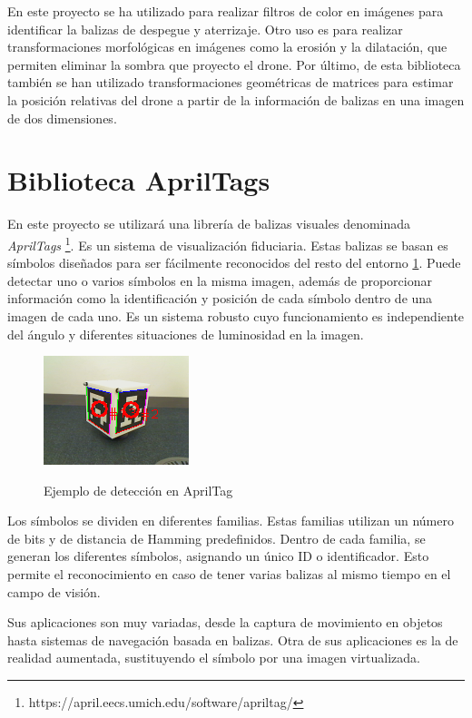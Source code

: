 {	En este proyecto se ha utilizado para realizar filtros de color en imágenes para identificar la balizas de despegue y aterrizaje. Otro uso es para realizar transformaciones morfológicas en imágenes como la erosión y la dilatación, que permiten eliminar la sombra que proyecto el drone. Por último, de esta biblioteca también se han utilizado transformaciones geométricas de matrices para estimar la posición relativas del drone a partir de la información de balizas en una imagen de dos dimensiones.
	
	\section{Biblioteca AprilTags}
	\label{sec:AprilTags}
	
	En este proyecto se utilizará una librería de balizas visuales denominada \textit{AprilTags} \footnote{https://april.eecs.umich.edu/software/apriltag/}. Es un sistema de visualización fiduciaria. Estas balizas se basan es símbolos diseñados para ser fácilmente reconocidos del resto del entorno \ref{FIG:33_apriltag}. Puede detectar uno o varios símbolos en la misma imagen, además de proporcionar información como la identificación y posición de cada símbolo dentro de una imagen de cada uno. Es un sistema robusto cuyo funcionamiento es independiente del ángulo y diferentes situaciones de luminosidad en la imagen.
	
	\begin{figure}[H]
		\centering
		{\includegraphics[scale=1.56]{imag/apriltag.png}}
		\caption{Ejemplo de detección en AprilTag}
		
		\label{FIG:33_apriltag}
	\end{figure}
	
	
	Los símbolos se dividen en diferentes familias. Estas familias utilizan un número de bits y de distancia de Hamming predefinidos. Dentro de cada familia, se generan los diferentes símbolos, asignando un único ID o identificador. Esto permite el reconocimiento en caso de tener varias balizas al mismo tiempo en el campo de visión.
	
	Sus aplicaciones son muy variadas, desde la captura de movimiento en objetos hasta sistemas de navegación basada en balizas. Otra de sus aplicaciones es la de realidad aumentada, sustituyendo el símbolo por una imagen virtualizada.
	
}

